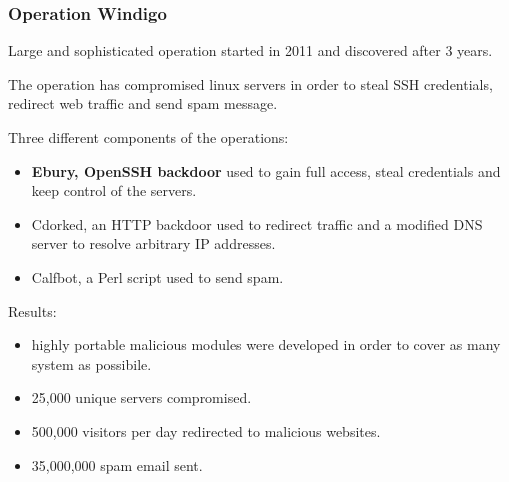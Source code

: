 \begin{frame}
	\frametitle{Operation Windigo}
	
	Large and sophisticated operation started in 2011 and discovered after 3 years.
	
	\smallskip
	
	The operation has compromised linux servers in order to steal SSH credentials, redirect web traffic and send spam message.
	
	\smallskip
	
  Three different components of the operations:
  
  \begin{itemize}
    \item \textbf{Ebury, OpenSSH backdoor} used to gain full access, steal credentials and keep control of the servers.
    \item Cdorked, an HTTP backdoor used to redirect traffic and a modified DNS server to resolve arbitrary IP addresses.
    \item Calfbot, a Perl script used to send spam.
  \end{itemize}	

	\smallskip
	
  Results:
  
  \begin{itemize}
    \item highly portable malicious modules were developed in order to cover as many system as possibile.
    \item 25,000 unique servers compromised.
    \item 500,000 visitors per day redirected to malicious websites.
    \item 35,000,000 spam email sent.
  \end{itemize}
\end{frame}


